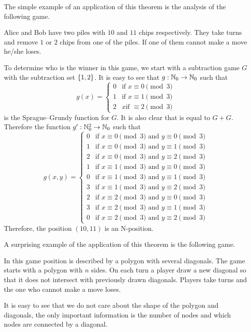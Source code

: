 The simple example of an application of this theorem is the analysis of the
following game.
\begin{game}
\label{game:subtraction-1-2-3-out-of-10-11}
  Alice and Bob have two piles with $10$ and $11$ chips respectively.
  They take turns and remove $1$ or $2$ chips from one of the piles.
  If one of them cannot make a move he/she loses.
\end{game}

To determine who is the winner in this game, we start with a subtraction game
$G$ with the subtraction set $\set{1, 2}$. It is easy to see that 
$g : {\mathbb{N}}_0 \to {\mathbb{N}}_0$ such that
\[
  g(x) =
  \begin{cases}
    0 & \text{if } x \equiv 0 \pmod{3} \\
    1 & \text{if } x \equiv 1 \pmod{3} \\
    2 & x \text{if } \equiv 2 \pmod{3}
  \end{cases}
\]
is the Sprague--Grundy function for $G$. 
It is also clear that  is equal to 
$G + G$. Therefore the function $g' : {\mathbb{N}}_0^2 \to {\mathbb{N}}_0$ such that 
\[
  g(x, y) =
  \begin{cases}
    0 & \text{if } x \equiv 0 \pmod{3} \text{ and } y \equiv 0 \pmod{3}\\
    1 & \text{if } x \equiv 0 \pmod{3} \text{ and } y \equiv 1 \pmod{3}\\
    2 & \text{if } x \equiv 0 \pmod{3} \text{ and } y \equiv 2 \pmod{3}\\
    1 & \text{if } x \equiv 1 \pmod{3} \text{ and } y \equiv 0 \pmod{3}\\
    0 & \text{if } x \equiv 1 \pmod{3} \text{ and } y \equiv 1 \pmod{3}\\
    3 & \text{if } x \equiv 1 \pmod{3} \text{ and } y \equiv 2 \pmod{3}\\
    2 & \text{if } x \equiv 2 \pmod{3} \text{ and } y \equiv 0 \pmod{3}\\
    3 & \text{if } x \equiv 2 \pmod{3} \text{ and } y \equiv 1 \pmod{3}\\
    0 & \text{if } x \equiv 2 \pmod{3} \text{ and } y \equiv 2 \pmod{3}
  \end{cases}
\]
Therefore, the position $(10, 11)$ is an N-position.

A surprising example of the application of this theorem is the following game.
\begin{game}
\label{game:polygon}
  In this game position is described by a polygon with several diagonals. 
  The game starts with a polygon with $n$ sides. On each turn a player draw a
  new diagonal so that it does not intersect with previously drawn diagonals.
  Players take turns and the one who cannot make a move loses.
\end{game}
It is easy to see that we do not care about the shape of the polygon and
diagonals, the only important information is the number of nodes and which nodes
are connected by a diagonal. 

